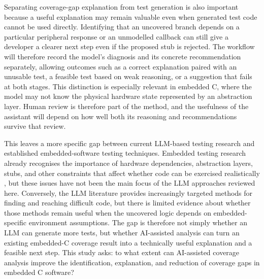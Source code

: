 \documentclass[conference]{IEEEtran}
\begin{document}
Separating coverage-gap explanation from test generation is also important
because a useful explanation may remain valuable even when generated test code
cannot be used directly. Identifying that an uncovered branch depends on a
particular peripheral response or an unmodelled callback can still give a
developer a clearer next step even if the proposed stub is rejected. The
workflow will therefore record the model's diagnosis and its concrete
recommendation separately, allowing outcomes such as a correct explanation
paired with an unusable test, a feasible test based on weak reasoning, or a
suggestion that fails at both stages. This distinction is especially relevant
in embedded C, where the model may not know the physical hardware state
represented by an abstraction layer. Human review is therefore part of the
method, and the usefulness of the assistant will depend on how well both its
reasoning and recommendations survive that review.


This leaves a more specific gap between current LLM-based testing research and
established embedded-software testing techniques. Embedded testing research
already recognises the importance of hardware dependencies, abstraction layers,
stubs, and other constraints that affect whether code can be exercised
realistically \cite{garousi2018,zhang2018,mangels2012}, but these issues have
not been the main focus of the LLM approaches reviewed here. Conversely, the
LLM literature provides increasingly targeted methods for finding and reaching
difficult code, but there is limited evidence about whether those methods remain
useful when the uncovered logic depends on embedded-specific environment
assumptions. The gap is therefore not simply whether an LLM can generate more
tests, but whether AI-assisted analysis can turn an existing embedded-C
coverage result into a technically useful explanation and a feasible next
step. This study asks: to what extent can AI-assisted coverage analysis improve
the identification, explanation, and reduction of coverage gaps in embedded C
software?

\end{document}
